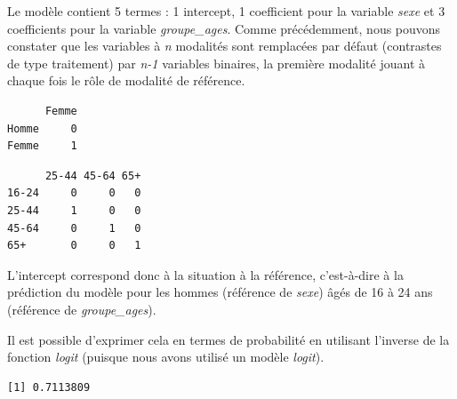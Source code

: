 \documentclass[
  letterpaper,
  DIV=11,
  numbers=noendperiod,
  oneside]{scrreprt}
\newenvironment{Shaded}{\begin{snugshade}}{\end{snugshade}}
\newcommand{\FloatTok}[1]{\textcolor[rgb]{0.68,0.00,0.00}{#1}}
\newcommand{\FunctionTok}[1]{\textcolor[rgb]{0.28,0.35,0.67}{#1}}
\newcommand{\NormalTok}[1]{\textcolor[rgb]{0.00,0.23,0.31}{#1}}
\newcommand{\OtherTok}[1]{\textcolor[rgb]{0.00,0.23,0.31}{#1}}
\newcommand{\SpecialCharTok}[1]{\textcolor[rgb]{0.37,0.37,0.37}{#1}}
\newcommand{\StringTok}[1]{\textcolor[rgb]{0.13,0.47,0.30}{#1}}
\begin{document}
Le modèle contient 5 termes : 1 intercept, 1 coefficient pour la
variable \emph{sexe} et 3 coefficients pour la variable
\emph{groupe\_ages}. Comme précédemment, nous pouvons constater que les
variables à \emph{n} modalités sont remplacées par défaut (contrastes de
type traitement) par \emph{n-1} variables binaires, la première modalité
jouant à chaque fois le rôle de modalité de référence.

\begin{Shaded}
\end{Shaded}

\begin{verbatim}
      Femme
Homme     0
Femme     1
\end{verbatim}

\begin{Shaded}
\end{Shaded}

\begin{verbatim}
      25-44 45-64 65+
16-24     0     0   0
25-44     1     0   0
45-64     0     1   0
65+       0     0   1
\end{verbatim}

L'intercept correspond donc à la situation à la référence, c'est-à-dire
à la prédiction du modèle pour les hommes (référence de \emph{sexe})
âgés de 16 à 24 ans (référence de \emph{groupe\_ages}).

Il est possible d'exprimer cela en termes de probabilité en utilisant
l'inverse de la fonction \emph{logit} (puisque nous avons utilisé un
modèle \emph{logit}).

\begin{Shaded}
\end{Shaded}

\begin{verbatim}
[1] 0.7113809
\end{verbatim}
\end{document}

